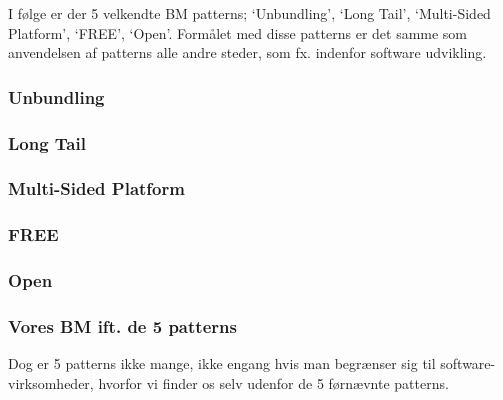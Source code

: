 
I følge \citet[pp. 52-119]{osterwalder2009business} er der 5 velkendte BM patterns; `Unbundling', `Long Tail', `Multi-Sided Platform', `FREE', `Open'.
Formålet med disse patterns er det samme som anvendelsen af patterns alle andre steder, som fx. indenfor software udvikling.

\subsubsection{Unbundling}


\subsubsection{Long Tail}


\subsubsection{Multi-Sided Platform}


\subsubsection{FREE}


\subsubsection{Open}


\subsubsection{Vores BM ift. de 5 patterns}
Dog er 5 patterns ikke mange, ikke engang hvis man begrænser sig til software-virksomheder, hvorfor vi finder os selv udenfor de 5 førnævnte patterns.

